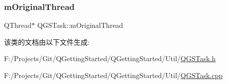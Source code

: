 \mbox{\label{class_q_g_s_task_ae4af5415a2f7e1ecc00935ecd6e5cdfc}} 
\subsubsection{\texorpdfstring{m\+Original\+Thread}{mOriginalThread}}
{\footnotesize\ttfamily Q\+Thread$\ast$ Q\+G\+S\+Task\+::m\+Original\+Thread\hspace{0.3cm}{\ttfamily [protected]}}



该类的文档由以下文件生成\+:\begin{DoxyCompactItemize}
\item 
F\+:/\+Projects/\+Git/\+Q\+Getting\+Started/\+Q\+Getting\+Started/\+Util/\mbox{\hyperlink{_q_g_s_task_8h}{Q\+G\+S\+Task.\+h}}\item 
F\+:/\+Projects/\+Git/\+Q\+Getting\+Started/\+Q\+Getting\+Started/\+Util/\mbox{\hyperlink{_q_g_s_task_8cpp}{Q\+G\+S\+Task.\+cpp}}\end{DoxyCompactItemize}
